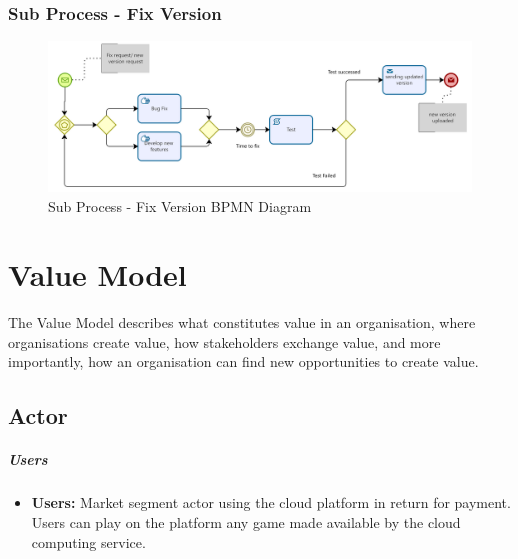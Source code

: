 \documentclass[a4paper,12pt]{report}
\begin{document}
\subsection{Sub Process - Fix Version }
\begin{figure}[H]
 \centering
\includegraphics[scale=0.35]{developer_BPMN}
\caption{Sub Process - Fix Version BPMN Diagram}
\label{Fix Version BPMN}

\end{figure} 

\chapter{Value Model}
The Value Model describes what constitutes value in an organisation, where organisations create value, how stakeholders exchange value, and more importantly, how an organisation can find new opportunities to create value.

\section{Actor}

\paragraph*{Users}
\begin{itemize}
\item{\textbf{Users:} Market segment actor using the cloud platform in return for payment.
Users can play on the platform any game made available by the cloud computing service.} 
%
\end{itemize}
%
%
\end{document}
